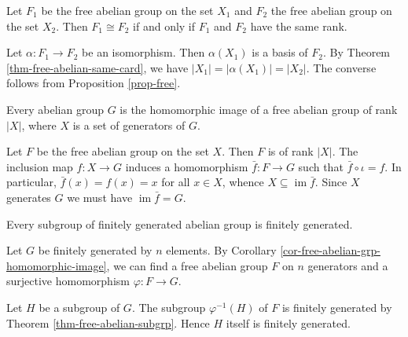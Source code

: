 
\begin{corollary} \label{cor-free-abelian-isom}
	Let $F_1$ be the free abelian group on the set $X_1$ and $F_2$ the free abelian group on the set $X_2$. Then $F_1 \cong F_2$ if and only if $F_1$ and $F_2$ have the same rank.
\end{corollary}
\begin{sketch}
	Let  $\alpha : F_1\rightarrow F_2$ be an isomorphism. Then $\alpha(X_1)$ is a basis of $F_2$. By Theorem \ref{thm-free-abelian-same-card}, we have $|X_1| = |\alpha(X_1)| = |X_2|$. The converse follows from Proposition \ref{prop-free}. 
\end{sketch}

\begin{corollary} \label{cor-free-abelian-grp-homomorphic-image}
	Every abelian group $G$ is the homomorphic image of a free abelian group of rank $|X|$, where $X$ is a set of generators of $G$.
\end{corollary}
\begin{sketch}
	Let $F$ be the free abelian group on the set $X$. Then $F$ is of rank $|X|$. The inclusion map $f:X \to G$ induces a homomorphism $\bar{f} \colon F \to G$ such that $\bar{f}\circ\iota = f$. In particular, $\bar{f}(x) = f(x) = x$ for all $x\in X$, whence $X \subseteq \operatorname{im} \bar{f}$. Since $X$ generates $G$ we must have $\operatorname{im} \bar{f} = G$.
\end{sketch}

\begin{corollary} \label{cor-subgrp-FGAG-is-FG}
	Every subgroup of finitely generated abelian group is finitely generated.
\end{corollary}
\begin{sketch}
	Let $G$ be finitely generated by $n$ elements. By Corollary \ref{cor-free-abelian-grp-homomorphic-image},  we can find a free abelian group $F$ on $n$ generators and a surjective homomorphism
	$\varphi: F \to G $. 
	
	Let $H$ be a subgroup of $G$. The subgroup $\varphi^{-1}(H)$ of $F$ is finitely generated by Theorem \ref{thm-free-abelian-subgrp}. Hence $H$ itself is finitely generated.
\end{sketch}


